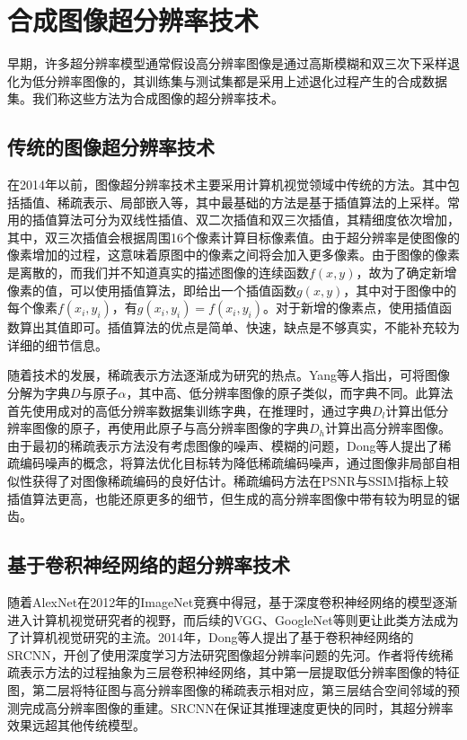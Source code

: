 \section{合成图像超分辨率技术}
早期，许多超分辨率模型通常假设高分辨率图像是通过高斯模糊和双三次下采样退化为低分辨率图像的，其训练集与测试集都是采用上述退化过程产生的合成数据集。我们称这些方法为合成图像的超分辨率技术。
\subsection{传统的图像超分辨率技术}
在2014年以前，图像超分辨率技术主要采用计算机视觉领域中传统的方法。其中包括插值、稀疏表示、局部嵌入等，其中最基础的方法是基于插值算法的上采样。常用的插值算法可分为双线性插值、双二次插值和双三次插值，其精细度依次增加，其中，双三次插值会根据周围16个像素计算目标像素值。由于超分辨率是使图像的像素增加的过程，这意味着原图中的像素之间将会加入更多像素。由于图像的像素是离散的，而我们并不知道真实的描述图像的连续函数$f(x,y)$，故为了确定新增像素的值，可以使用插值算法，即给出一个插值函数$g(x,y)$，其中对于图像中的每个像素$f(x_i,y_i)$，有$g(x_i,y_i)=f(x_i,y_i)$。对于新增的像素点，使用插值函数算出其值即可。插值算法的优点是简单、快速，缺点是不够真实，不能补充较为详细的细节信息。

随着技术的发展，稀疏表示方法逐渐成为研究的热点。Yang等人\parencite{4587647}指出，可将图像分解为字典$D$与原子$\alpha$，其中高、低分辨率图像的原子类似，而字典不同。此算法首先使用成对的高低分辨率数据集训练字典，在推理时，通过字典$D_l$计算出低分辨率图像的原子，再使用此原子与高分辨率图像的字典$D_h$计算出高分辨率图像。由于最初的稀疏表示方法没有考虑图像的噪声、模糊的问题，Dong等人\parencite{6392274}提出了稀疏编码噪声的概念，将算法优化目标转为降低稀疏编码噪声，通过图像非局部自相似性获得了对图像稀疏编码的良好估计。稀疏编码方法在PSNR与SSIM\parencite{wang2002universal}指标上较插值算法更高，也能还原更多的细节，但生成的高分辨率图像中带有较为明显的锯齿。


\subsection{基于卷积神经网络的超分辨率技术}
随着AlexNet\parencite{NIPS2012_c399862d}在2012年的ImageNet竞赛中得冠，基于深度卷积神经网络的模型逐渐进入计算机视觉研究者的视野，而后续的VGG\parencite{simonyan2014very}、GoogleNet\parencite{szegedy2015going}等则更让此类方法成为了计算机视觉研究的主流。2014年，Dong等人\parencite{SRCNN}提出了基于卷积神经网络的SRCNN，开创了使用深度学习方法研究图像超分辨率问题的先河。作者将传统稀疏表示方法的过程抽象为三层卷积神经网络，其中第一层提取低分辨率图像的特征图，第二层将特征图与高分辨率图像的稀疏表示相对应，第三层结合空间邻域的预测完成高分辨率图像的重建。SRCNN在保证其推理速度更快的同时，其超分辨率效果远超其他传统模型。

